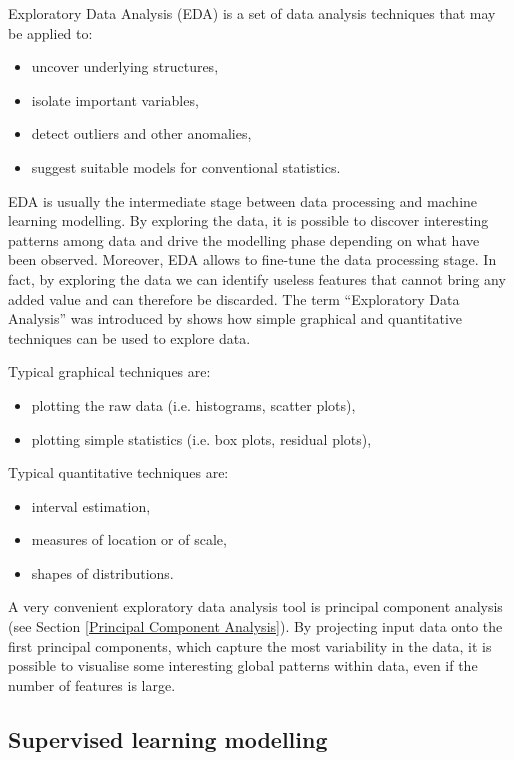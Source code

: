 Exploratory Data Analysis (EDA) is a set of data analysis techniques that may be applied to:
%
\begin{itemize}
    \item uncover underlying structures,
    \item isolate important variables,
    \item detect outliers and other anomalies,
    \item suggest suitable models for conventional statistics.
\end{itemize}
%
EDA is usually the intermediate stage between data processing and machine learning modelling. By exploring the data, it is possible to discover interesting patterns among data and drive the modelling phase depending on what have been observed. Moreover, EDA allows to fine-tune the data processing stage. In fact, by exploring the data we can identify useless features that cannot bring any added value and can therefore be discarded.   
The term “Exploratory Data Analysis” was introduced by \citet{tukey1977exploratory} shows how simple graphical and quantitative techniques can be used to explore data.

Typical graphical techniques are:

\begin{itemize}
    \item plotting the raw data (i.e. histograms, scatter plots),
    \item plotting simple statistics (i.e. box plots, residual plots),
\end{itemize}

Typical quantitative techniques are:

\begin{itemize}
    \item interval estimation,
    \item measures of location or of scale,
    \item shapes of distributions.
\end{itemize}
%
A very convenient exploratory data analysis tool is principal component analysis (see Section \ref{Principal Component Analysis}). By projecting input data onto the first principal components, which capture the most variability in the data, it is possible to visualise some interesting global patterns within data, even if the number of features is large. 

\subsection{Supervised learning modelling} \label{Machine Learning modeling}

